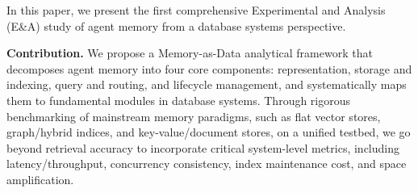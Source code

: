 \documentclass{llmxive}
\providecommand{\llm}{\textsc{LLM}\xspace}
\providecommand{\zw}[1]{#1}
\providecommand{\zxh}[1]{#1}
\begin{document}








In this paper, we present the first comprehensive Experimental and Analysis (E\&A) study of agent memory from a database systems perspective.

\noindent \textbf{Contribution.} We propose a Memory-as-Data analytical framework that decomposes agent memory into four core components: representation, storage and indexing, query and routing, and lifecycle management, and systematically maps them to fundamental modules in database systems. Through rigorous benchmarking of mainstream memory paradigms, such as flat vector stores, graph/hybrid indices, and key-value/document stores, on a unified testbed, we go beyond retrieval accuracy to incorporate critical system-level metrics, including latency/throughput, concurrency consistency, index maintenance cost, and space amplification.
\end{document}

